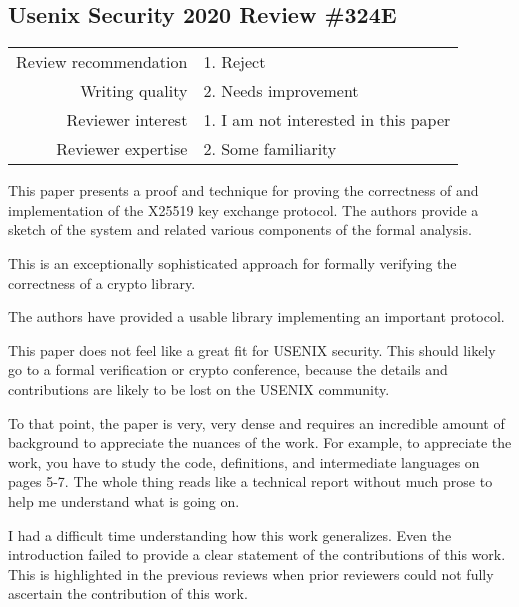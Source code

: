 \newpage
\subsection{Usenix Security 2020 Review \#324E}

\begin{tabular}{rl}
    \toprule
    Review recommendation & 1. Reject                            \\
    Writing quality       & 2. Needs improvement                 \\
    Reviewer interest     & 1. I am not interested in this paper \\
    Reviewer expertise    & 2. Some familiarity                  \\
    \bottomrule
\end{tabular}

\begin{center}
\end{center}
This paper presents a proof and technique for proving the correctness of and implementation of the X25519 key exchange protocol.  The authors provide a sketch of the system and related various components of the formal analysis.

\begin{center}
\end{center}
This is an exceptionally sophisticated approach for formally verifying the correctness of a crypto library.

The authors have provided a usable library implementing an important protocol.

\begin{center}
\end{center}
This paper does not feel like a great fit for USENIX security.   This should likely go to a formal verification or crypto conference, because the details and contributions are likely to be lost on the USENIX community.

To that point, the paper is very, very dense and requires an incredible amount of background to appreciate the nuances of the work.  For example, to appreciate the work, you have to study the code, definitions, and intermediate languages on pages 5-7.  The whole thing reads like a technical report without much prose to help me understand what is going on.

I had a difficult time understanding how this work generalizes. Even the introduction failed to provide a clear statement of the contributions of this work. This is highlighted in the previous reviews when prior reviewers could not fully ascertain the contribution of this work.

